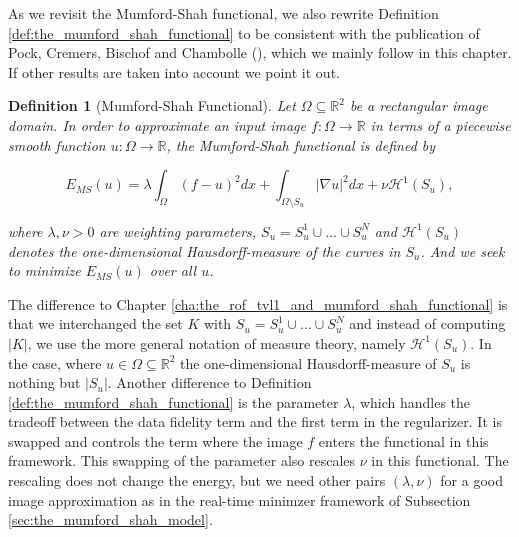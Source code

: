 \documentclass[abstracton]{scrreprt}
\newtheorem{definition}[theorem]{Definition}
\begin{document}
    As we revisit the Mumford-Shah functional, we also rewrite Definition \ref{def:the_mumford_shah_functional} to be consistent with the publication of Pock, Cremers, Bischof and Chambolle (\cite{Pock-et-al-iccv09}), which we mainly follow in this chapter. If other results are taken into account we point it out.
    \begin{definition}[Mumford-Shah Functional] %
    \label{def:the_mumford_shah_functional_revisited}
        Let $\Omega \subseteq \mathbb{R}^{2}$ be a rectangular image domain. In order to approximate an input image $f: \Omega \longrightarrow \mathbb{R}$ in terms of a piecewise smooth function $u: \Omega \longrightarrow \mathbb{R}$, the Mumford-Shah functional is defined by
            
            \begin{equation}
                E_{MS}(u) = \lambda \int_{\Omega} (f - u)^{2} dx + \int_{\Omega \setminus S_{u}} |\nabla u|^{2} dx + \nu \mathcal{H}^{1}(S_{u}),
            \label{eq:the_mumford_shah_functional_revisited}
            \end{equation}
        
        where $\lambda, \nu > 0$ are weighting parameters, $S_{u} = S^{1}_{u} \cup ... \cup S^{N}_{u}$ and $\mathcal{H}^{1}(S_{u})$ denotes the one-dimensional Hausdorff-measure of the curves in $S_{u}$. And we seek to minimize $E_{MS}(u)$ over all $u$.
    \end{definition}
    The difference to Chapter \ref{cha:the_rof_tvl1_and_mumford_shah_functional} is that we interchanged the set $K$ with $S_{u} = S^{1}_{u} \cup ... \cup S^{N}_{u}$ and instead of computing $|K|$, we use the more general notation of measure theory, namely $\mathcal{H}^{1}(S_{u})$. In the case, where $u \in \Omega \subseteq \mathbb{R}^{2}$ the one-dimensional Hausdorff-measure of $S_{u}$ is nothing but $|S_{u}|$. Another difference to Definition \ref{def:the_mumford_shah_functional} is the parameter $\lambda$, which handles the tradeoff between the data fidelity term and the first term in the regularizer. It is swapped and controls the term where the image $f$ enters the functional in this framework. This swapping of the parameter also rescales $\nu$ in this functional. The rescaling does not change the energy, but we need other pairs $(\lambda, \nu)$ for a good image approximation as in the real-time minimzer framework of Subsection \ref{sec:the_mumford_shah_model}.\\
\end{document}
